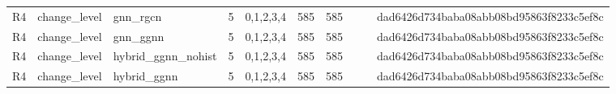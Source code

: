 \begin{table}[htbp]
{\begin{tabular}{lllrrrrrrl}
R4 & change\_level & gnn\_rgcn & 5 & 0,1,2,3,4 & 585 & 585 &  &  & dad6426d734baba08abb08bd95863f8233c5ef8c \\
R4 & change\_level & gnn\_ggnn & 5 & 0,1,2,3,4 & 585 & 585 &  &  & dad6426d734baba08abb08bd95863f8233c5ef8c \\
R4 & change\_level & hybrid\_ggnn\_nohist & 5 & 0,1,2,3,4 & 585 & 585 &  &  & dad6426d734baba08abb08bd95863f8233c5ef8c \\
R4 & change\_level & hybrid\_ggnn & 5 & 0,1,2,3,4 & 585 & 585 &  &  & dad6426d734baba08abb08bd95863f8233c5ef8c \\
\bottomrule
\end{tabular}}
\end{table}
